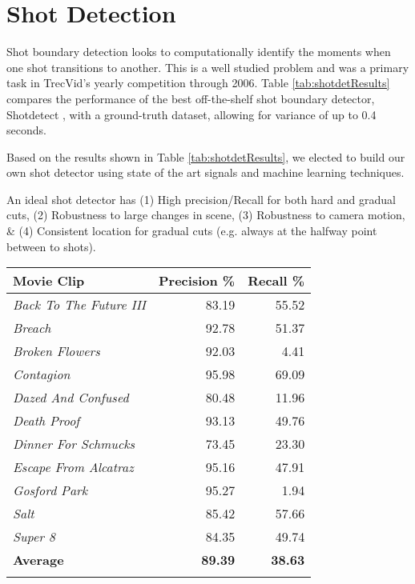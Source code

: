 \section*{Shot Detection}

Shot boundary detection looks to computationally identify the moments when one shot transitions to another. This is a well studied problem \cite{boreczky1996comparison} \cite{lienhart1998comparison} \cite{lu2013fast} \cite{chavan2014review} and was a primary task in TrecVid's yearly competition \cite{smeaton_video_2010} through 2006. Table \ref{tab:shotdetResults} compares the performance of the best off-the-shelf shot boundary detector, Shotdetect \cite{mathe_shotdetect_2015}, with a ground-truth dataset, allowing for variance of up to 0.4 seconds. 

Based on the results shown in Table \ref{tab:shotdetResults}, we elected to build our own shot detector using state of the art signals and machine learning techniques.

An ideal shot detector has (1) High precision/Recall for both hard and gradual cuts, (2) Robustness to large changes in scene, (3) Robustness to camera motion, \& (4) Consistent location for gradual cuts (e.g. always at the halfway point between to shots).


\begin{center}
  \small{
  \begin{tabular}{ l | r r }
    Movie Clip & Precision \% & Recall \% \\
    \hline
    \textit{ Back To The Future III } &  83.19 &  55.52\\
    \textit{ Breach } &  92.78 &  51.37\\
    \textit{ Broken Flowers } &  92.03 &  4.41\\
    \textit{ Contagion } &  95.98 &  69.09\\
    \textit{ Dazed And Confused } &  80.48 &  11.96\\
    \textit{ Death Proof } &  93.13 &  49.76\\
    \textit{ Dinner For Schmucks } &  73.45 &  23.30\\
    \textit{ Escape From Alcatraz } &  95.16 &  47.91\\
    \textit{ Gosford Park } &  95.27 &  1.94\\
    \textit{ Salt } &  85.42 &  57.66\\
    \textit{ Super 8 } &  84.35 &  49.74\\
    \textbf{ Average } &  \textbf{89.39} &  \textbf{38.63}\\
    \label{tab:shotdetResults}
  \end{tabular}}
\end{center}


